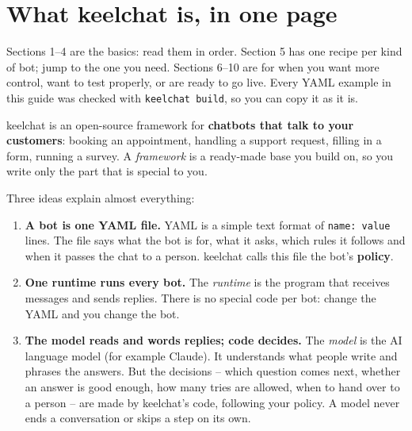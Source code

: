 \documentclass[11pt,a4paper]{article}
\newcommand{\codeus}{\textunderscore\allowbreak}
\newcommand{\code}[1]{{\renewcommand{\_}{\codeus}\texttt{\upshape #1}}}
\begin{document}
\tableofcontents
\thispagestyle{fancy}

\newpage

\section{What keelchat is, in one page}

\begin{note}
Sections 1--4 are the basics: read them in order. Section 5 has one recipe per kind of bot; jump to the one you
need. Sections 6--10 are for when you want more control, want to test properly, or are ready to go live.
Every YAML example in this guide was checked with \code{keelchat build}, so you can copy it as it is.
\end{note}

keelchat is an open-source framework for \textbf{chatbots that talk to your customers}: booking an appointment,
handling a support request, filling in a form, running a survey. A \emph{framework} is a ready-made base you
build on, so you write only the part that is special to you.

Three ideas explain almost everything:

\begin{enumerate}[leftmargin=1.4em]
  \item \textbf{A bot is one YAML file.} YAML is a simple text format of \code{name: value} lines. The file
    says what the bot is for, what it asks, which rules it follows and when it passes the chat to a person.
    keelchat calls this file the bot's \textbf{policy}.
  \item \textbf{One runtime runs every bot.} The \emph{runtime} is the program that receives messages and sends
    replies. There is no special code per bot: change the YAML and you change the bot.
  \item \textbf{The model reads and words replies; code decides.} The \emph{model} is the AI language model
    (for example Claude). It understands what people write and phrases the answers. But the decisions --
    which question comes next, whether an answer is good enough, how many tries are allowed, when to hand
    over to a person -- are made by keelchat's code, following your policy. A model never ends a
    conversation or skips a step on its own.
\end{enumerate}
\end{document}
